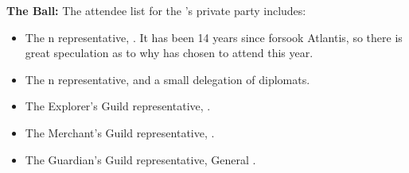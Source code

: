 \documentclass[blue]{NeptuneBall}
\begin{document}
{\bf The \cExExKing{} Ball:}
The attendee list for the \cKing{\King}'s private party includes:
\begin{itemize}
  \item The \pAmerica{}n representative, \cAriel{\King} \cAriel{}. It has been 14 years since \cAriel{} forsook Atlantis, so there is great speculation as to why \cAriel{\they} has chosen to attend this year.
  \item The \pPacifica{}n representative, \cPrince{\Prince} \cPrince{} and a small delegation of diplomats.
  \item The Explorer's Guild representative, \cPriest{}.
  \item The Merchant's Guild representative, \cSlave{}.
  \item The Guardian's Guild representative, General \cGeneral{}.
\end{itemize}
\end{document}
